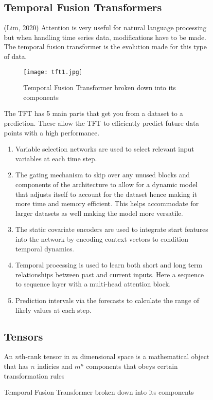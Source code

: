\documentclass{article}
\begin{document}
\begin{figure}[h!]
\subsection{Temporal Fusion Transformers}
(Lim, 2020)
Attention is very useful for natural language processing but when handling time series data,
modifications have to be made. The temporal fusion transformer is the evolution made for this
type of data.
\begin{figure}[h!]
    \centering
    \texttt{[image: tft1.jpg]}
    \caption{Temporal Fusion Transformer broken down into its components}
\end{figure}
The TFT has 5 main parts that get you from a dataset to a prediction. These allow the TFT to
efficiently predict future data points with a high performance.
\begin{enumerate}
\item Variable selection networks are used to select relevant input variables at each time step.
\item The gating mechanism to skip over any unused blocks and components of the architecture to allow for a dynamic model that adjusts itself to account for the dataset hence making it more time and memory efficient. This helps accommodate for larger datasets as well making the model more versatile.
\item The static covariate encoders are used to integrate start features into the network by encoding context vectors to condition temporal dynamics.
\item Temporal processing is used to learn both short and long term relationships between past and current inputs. Here a sequence to sequence layer with a multi-head attention block.
\item Prediction intervals via the forecasts to calculate the range of likely values at each step.
\end{enumerate}

\subsection{Tensors}
An $n$th-rank tensor in $m$ dimensional space is a mathematical object that has $n$ indicies and $m^n$ components that obeys certain transformation rules


\end{figure}
\end{document}
